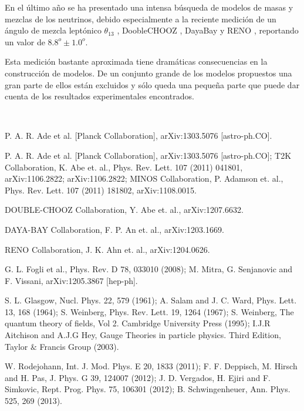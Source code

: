 \begin{titlepage}
\begin{minipage}{0.85\linewidth}
\begin{minipage}{0.85\linewidth}
\begin{resumen}
En el \'ultimo a\~no se ha presentado una intensa b\'usqueda de modelos de masas y mezclas  de los neutrinos, debido especialmente a la reciente medici\'on de un  \'angulo de mezcla lept\'onico  $\theta_{13}$ \cite{AB}, DoobleCHOOZ \cite{AC}, DayaBay \cite{AH} y RENO \cite{AD}, reportando un valor de  $8.8^o ± 1.0^o$.

Esta medici\'on bastante aproximada tiene dram\'aticas consecuencias en la construcci\'on de modelos. De un conjunto grande de los modelos propuestos una gran parte de ellos est\'an excluidos y s\'olo queda una peque\~na parte que puede dar cuenta de los resultados experimentales encontrados. 

    \end{resumen}
   \end{minipage}
   \vspace{10pt}
\end{minipage}
\vspace{10pt}\\[5pt]
\begin{thebibliography}{99}
  P. A. R. Ade et al. [Planck Collaboration], arXiv:1303.5076 [astro-ph.CO].

 P. A. R. Ade et al. [Planck Collaboration], arXiv:1303.5076 [astro-ph.CO]; T2K Collaboration, K. Abe et. al., Phys. Rev. Lett. 107 (2011) 041801, arXiv:1106.2822;
arXiv:1106.2822; MINOS Collaboration, P. Adamson et. al., Phys. Rev. Lett. 107 (2011) 181802, arXiv:1108.0015.

 DOUBLE-CHOOZ Collaboration, Y. Abe et. al., arXiv:1207.6632.

DAYA-BAY Collaboration, F. P. An et. al., arXiv:1203.1669.

 RENO Collaboration, J. K. Ahn et. al., arXiv:1204.0626.

  G. L. Fogli et al., Phys. Rev. D 78, 033010 (2008); M. Mitra, G. Senjanovic and F. Vissani, arXiv:1205.3867 [hep-ph].

  S. L. Glasgow, Nucl. Phys. 22, 579 (1961); A. Salam and J. C. Ward, Phys. Lett. 13,     168 (1964); S. Weinberg, Phys. Rev. Lett. 19, 1264 (1967); S. Weinberg, The quantum theory of fields, Vol 2. Cambridge University Press (1995); I.J.R Aitchison and A.J.G Hey, Gauge Theories in particle physics. Third Edition, Taylor $\&$ Francis Group (2003).

 W. Rodejohann, Int. J. Mod. Phys. E 20, 1833 (2011); F. F. Deppisch, M. Hirsch and H. Pas, J. Phys. G 39, 124007 (2012); J. D. Vergados, H. Ejiri and F. Simkovic, Rept. Prog. Phys. 75, 106301 (2012); B. Schwingenheuer, Ann. Phys. 525, 269 (2013).



\end{thebibliography}
\end{titlepage}
